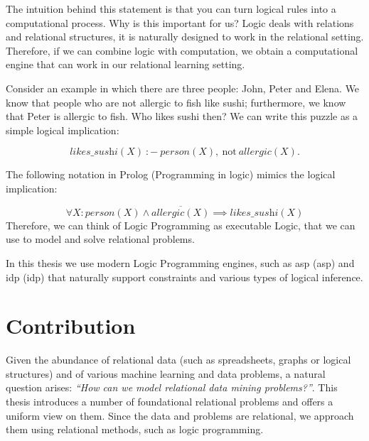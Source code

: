 The intuition behind this statement is that
you can turn logical rules into a computational process. 
Why is this important for us? Logic deals with
relations and relational structures, it is naturally designed to
work in the relational setting. Therefore, if we can combine logic
with computation, we obtain a computational engine that can work in
our relational learning setting.

Consider an example in which there are three people: John, Peter and Elena. 
We know that people who are not allergic to fish like sushi; 
furthermore, we know that Peter is allergic to fish. 
Who likes sushi then? We can write this puzzle as a
simple logical implication:

\begin{equation*}
  \textit{likes\_sushi}(X)~{:}{-}~\textit{person}(X),~\text{not}~
  \textit{allergic}(X). 
\end{equation*}

The following notation in Prolog (Programming in logic)
\parencite{prolog_original} mimics the logical implication:

\begin{equation*}
  \forall X: \textit{person}(X) \wedge \overline{\textit{allergic}(X)}
  \implies \textit{likes\_sushi}(X)
\end{equation*}
Therefore, we can think of Logic Programming as executable Logic, that
we can use to model and solve relational problems.

In this thesis we use modern Logic Programming engines, such
as \acrlong{asp} (\acrshort{asp}) \parencite{ASPbook,whatisasp} and
\acrlong{idp} (\acrshort{idp})
\parencite{idp} %
that naturally support constraints and various types of logical
inference.


\section{Contribution}
Given the abundance of relational data (such as spreadsheets, graphs
or logical structures) and of various machine learning and data
problems, a natural question arises: \textit{``How can we model
relational data mining problems?''}. This thesis introduces a number
of foundational relational problems and offers a uniform view on them.
Since the data and problems are relational, we approach them using
relational methods, such as logic programming. 

